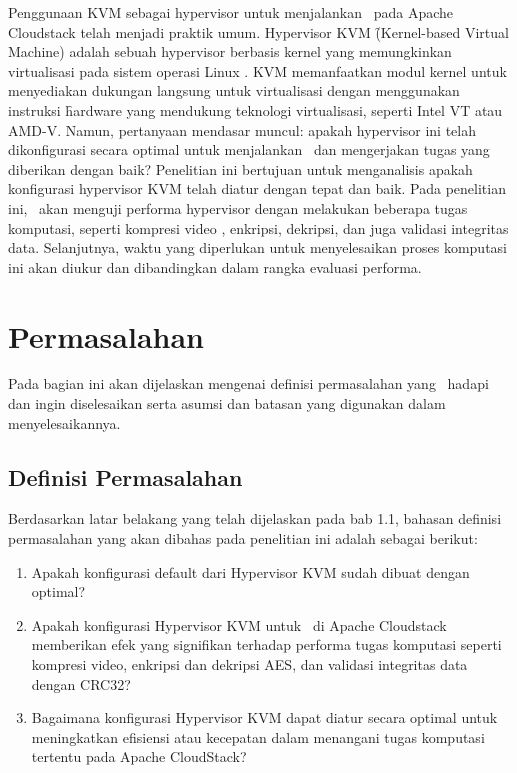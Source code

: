 Penggunaan KVM sebagai hypervisor untuk menjalankan \vm\ pada Apache Cloudstack telah menjadi praktik umum. Hypervisor KVM \f{(Kernel-based Virtual Machine)} adalah sebuah hypervisor berbasis kernel yang memungkinkan virtualisasi pada sistem operasi Linux \cite{whatiskvm}. KVM memanfaatkan modul kernel untuk menyediakan dukungan langsung untuk virtualisasi dengan menggunakan instruksi \f{hardware} yang mendukung teknologi virtualisasi, seperti Intel VT atau AMD-V. Namun, pertanyaan mendasar muncul: apakah hypervisor ini telah dikonfigurasi secara optimal untuk menjalankan \vm\ dan mengerjakan tugas yang diberikan dengan baik? Penelitian ini bertujuan untuk menganalisis apakah konfigurasi hypervisor KVM telah diatur dengan tepat dan baik. Pada penelitian ini, \saya\ akan menguji performa hypervisor dengan melakukan beberapa tugas komputasi, seperti kompresi video \cite{Folgar2014eg}, enkripsi, dekripsi, dan juga validasi integritas data. Selanjutnya, waktu yang diperlukan untuk menyelesaikan proses komputasi ini akan diukur dan dibandingkan dalam rangka evaluasi performa.


\section{Permasalahan}
Pada bagian ini akan dijelaskan mengenai definisi permasalahan yang \saya\ hadapi dan ingin diselesaikan serta asumsi dan batasan yang digunakan dalam menyelesaikannya.

\subsection{Definisi Permasalahan}
Berdasarkan latar belakang yang telah dijelaskan pada bab 1.1, bahasan definisi permasalahan yang akan dibahas pada penelitian ini adalah sebagai berikut:
\begin{enumerate}
      \item Apakah konfigurasi default dari Hypervisor KVM sudah dibuat dengan optimal?
      \item Apakah konfigurasi Hypervisor KVM untuk \vm\ di Apache Cloudstack memberikan efek yang signifikan terhadap performa tugas komputasi seperti kompresi video, enkripsi dan dekripsi AES, dan validasi integritas data dengan CRC32?
      \item Bagaimana konfigurasi Hypervisor KVM dapat diatur secara optimal untuk meningkatkan efisiensi atau kecepatan dalam menangani tugas komputasi tertentu pada Apache CloudStack?
\end{enumerate}

